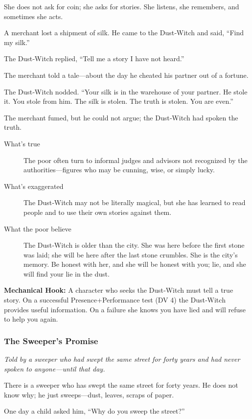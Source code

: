 \documentclass[11pt]{article}
\begin{document}
She does not ask for coin; she asks for stories. She listens, she remembers, and sometimes she acts.

A merchant lost a shipment of silk. He came to the Dust‑Witch and said, “Find my silk.”

The Dust‑Witch replied, “Tell me a story I have not heard.”

The merchant told a tale—about the day he cheated his partner out of a fortune.

The Dust‑Witch nodded. “Your silk is in the warehouse of your partner. He stole it. You stole from him. The silk is stolen. The truth is stolen. You are even.”

The merchant fumed, but he could not argue; the Dust‑Witch had spoken the truth.

\begin{description}
\item[What's true] The poor often turn to informal judges and advisors not recognized by the authorities—figures who may be cunning, wise, or simply lucky.
\item[What's exaggerated] The Dust‑Witch may not be literally magical, but she has learned to read people and to use their own stories against them.
\item[What the poor believe] The Dust‑Witch is older than the city. She was here before the first stone was laid; she will be here after the last stone crumbles. She is the city’s memory. Be honest with her, and she will be honest with you; lie, and she will find your lie in the dust.
\end{description}

\textbf{Mechanical Hook:} A character who seeks the Dust‑Witch must tell a true story. On a successful Presence+Performance test (DV 4) the Dust‑Witch provides useful information. On a failure she knows you have lied and will refuse to help you again.

\subsubsection{The Sweeper's Promise}
\textit{Told by a sweeper who had swept the same street for forty years and had never spoken to anyone—until that day.}

There is a sweeper who has swept the same street for forty years. He does not know why; he just sweeps—dust, leaves, scraps of paper.

One day a child asked him, “Why do you sweep the street?”
\end{document}

